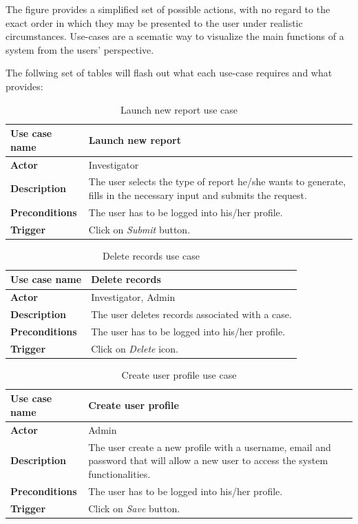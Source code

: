 The figure provides a simplified set of possible actions, with no regard to the
exact order in which they may be presented to the user under realistic
circumstances. Use-cases are a scematic way to visualize the main functions of a
system from the users' perspective.

The follwing set of tables will flash out what each use-case requires and what
provides:

\begin{table}[!h]
\centering
\begin{tabular}{l p{9cm}}  
\toprule
\bf{Use case name}    & Launch new report \\
\midrule
\bf{Actor}    & Investigator \\
\midrule
\bf{Description}    & The user selects the type of report he/she wants to
generate, fills in the necessary input and submits the request. \\
\midrule
\bf{Preconditions}    & The user has to be logged into his/her profile. \\
\midrule
\bf{Trigger}    & Click on \emph{Submit} button. \\
\bottomrule
\end{tabular}
\caption{Launch new report use case}
\end{table}

\begin{table}[!h]
\centering
\begin{tabular}{l p{9cm}}  
\toprule
\bf{Use case name}    & Delete records \\
\midrule
\bf{Actor}    & Investigator, Admin \\
\midrule
\bf{Description}    & The user deletes records associated with a case. \\
\midrule
\bf{Preconditions}    & The user has to be logged into his/her profile. \\
\midrule
\bf{Trigger}    & Click on \emph{Delete} icon. \\
\bottomrule
\end{tabular}
\caption{Delete records use case}
\end{table}

\begin{table}[!h]
\centering
\begin{tabular}{l p{9cm}}  
\toprule
\bf{Use case name}    & Create user profile \\
\midrule
\bf{Actor}    & Admin \\
\midrule
\bf{Description}    & The user create a new profile with a username, email and
password that will allow a new user to access the system functionalities.
\\
\midrule
\bf{Preconditions}    & The user has to be logged into his/her profile. \\
\midrule
\bf{Trigger}    & Click on \emph{Save} button. \\
\bottomrule
\end{tabular}
\caption{Create user profile use case}
\end{table}


